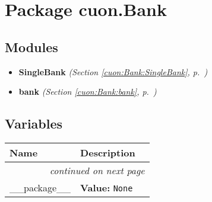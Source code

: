 %
%
%


\section{Package cuon.Bank}

    \label{cuon:Bank}


\subsection{Modules}

\begin{itemize}
\setlength{\parskip}{0ex}
\item \textbf{SingleBank}
  \textit{(Section \ref{cuon:Bank:SingleBank}, p.~\pageref{cuon:Bank:SingleBank})}

\item \textbf{bank}
  \textit{(Section \ref{cuon:Bank:bank}, p.~\pageref{cuon:Bank:bank})}

\end{itemize}



  \subsection{Variables}

    \vspace{-1cm}
\hspace{\varindent}\begin{longtable}{|p{\varnamewidth}|p{\vardescrwidth}|l}
\cline{1-2}
\cline{1-2} \centering \textbf{Name} & \centering \textbf{Description}& \\
\cline{1-2}
\endhead\cline{1-2}\multicolumn{3}{r}{\small\textit{continued on next page}}\\\endfoot\cline{1-2}
\endlastfoot\raggedright \_\-\_\-p\-a\-c\-k\-a\-g\-e\-\_\-\_\- & \raggedright \textbf{Value:} 
{\tt None}&\\
\cline{1-2}
\end{longtable}

